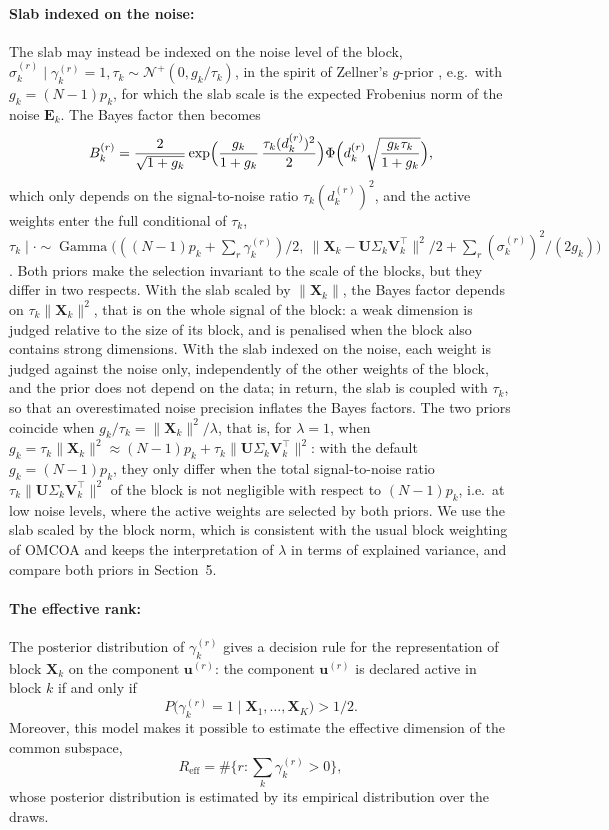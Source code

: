 \documentclass[11pt]{article}
\DeclareMathOperator{\Ga}{Gamma}
\newcommand{\X}{\mathbf{X}}
\newcommand{\U}{\mathbf{U}}
\newcommand{\V}{\mathbf{V}}
\newcommand{\EE}{\mathbf{E}}
\newcommand{\uu}{\mathbf{u}}
\begin{document}
\paragraph{Slab indexed on the noise:} The slab may instead be indexed on the noise level of the block, $\sigma_k^{(r)}\mid\gamma_k^{(r)}=1,\tau_k\sim\mathcal N^+(0,g_k/\tau_k)$, in the spirit of Zellner's $g$-prior \citep{zellner1986,liang2008}, e.g.\ with $g_k=(N-1)p_k$, for which the slab scale is the expected Frobenius norm of the noise $\EE_k$. The Bayes factor then becomes
\[
  B_k^{(r)}=\frac{2}{\sqrt{1+g_k}}\exp\Bigl(\frac{g_k}{1+g_k}\,\frac{\tau_k(d_k^{(r)})^2}{2}\Bigr)\Phi\Bigl(d_k^{(r)}\sqrt{\frac{g_k\tau_k}{1+g_k}}\Bigr),
\]
which only depends on the signal-to-noise ratio $\tau_k(d_k^{(r)})^2$, and the active weights enter the full conditional of $\tau_k$, $\tau_k\mid\cdot\sim\Ga\bigl(((N-1)p_k+\sum_r\gamma_k^{(r)})/2,\ \|\X_k-\U\Sigma_k\V_k^\intercal\|^2/2+\sum_r(\sigma_k^{(r)})^2/(2g_k)\bigr)$. Both priors make the selection invariant to the scale of the blocks, but they differ in two respects. With the slab scaled by $\|\X_k\|$, the Bayes factor depends on $\tau_k\|\X_k\|^2$, that is on the whole signal of the block: a weak dimension is judged relative to the size of its block, and is penalised when the block also contains strong dimensions. With the slab indexed on the noise, each weight is judged against the noise only, independently of the other weights of the block, and the prior does not depend on the data; in return, the slab is coupled with $\tau_k$, so that an overestimated noise precision inflates the Bayes factors. The two priors coincide when $g_k/\tau_k=\|\X_k\|^2/\lambda$, that is, for $\lambda=1$, when $g_k=\tau_k\|\X_k\|^2\approx(N-1)p_k+\tau_k\|\U\Sigma_k\V_k^\intercal\|^2$: with the default $g_k=(N-1)p_k$, they only differ when the total signal-to-noise ratio $\tau_k\|\U\Sigma_k\V_k^\intercal\|^2$ of the block is not negligible with respect to $(N-1)p_k$, i.e.\ at low noise levels, where the active weights are selected by both priors. We use the slab scaled by the block norm, which is consistent with the usual block weighting of OMCOA and keeps the interpretation of $\lambda$ in terms of explained variance, and compare both priors in Section~5.


\paragraph{The effective rank:} The posterior distribution of $\gamma_k^{(r)}$ gives a decision rule for the representation of block $\X_k$ on the component $\uu^{(r)}$: the component $\uu^{(r)}$ is declared active in block $k$ if and only if
\begin{equation}
  P\bigl(\gamma_k^{(r)}=1\mid\X_1,\ldots,\X_K\bigr)>1/2 .
  \label{dec_rule}
\end{equation}
\noindent Moreover, this model makes it possible to estimate the effective dimension of the common subspace,
\[R_{\mathrm{eff}}=\#\{r:\sum_k\gamma_k^{(r)}>0\},\]
 whose posterior distribution is estimated by its empirical distribution over the draws. 
\end{document}
